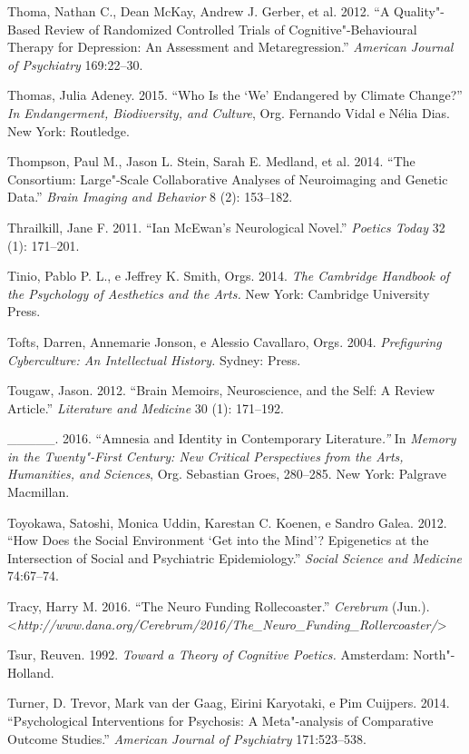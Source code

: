 {\begin{Parskip}
Thoma, Nathan C., Dean McKay, Andrew J. Gerber, et al. 2012. ``A
Quality"-Based Review of Randomized Controlled Trials of
Cognitive"-Behavioural Therapy for Depression: An Assessment and
Metaregression.'' \emph{American Journal of Psychiatry} 169:22--30.

Thomas, Julia Adeney. 2015. ``Who Is the `We' Endangered by Climate
Change?'' \emph{In Endangerment, Biodiversity, and Culture}, Org.
Fernando Vidal e Nélia Dias. New York: Routledge.

Thompson, Paul M., Jason L. Stein, Sarah E. Medland, et al. 2014. ``The
 Consortium: Large"-Scale Collaborative Analyses of Neuroimaging
and Genetic Data.'' \emph{Brain Imaging and Behavior} 8 (2): 153--182.

Thrailkill, Jane F. 2011. ``Ian McEwan's Neurological Novel.''
\emph{Poetics Today} 32 (1): 171--201.

Tinio, Pablo P. L., e Jeffrey K. Smith, Orgs. 2014. \emph{The Cambridge
Handbook of the Psychology of Aesthetics and the Arts.} New York:
Cambridge University Press.

Tofts, Darren, Annemarie Jonson, e Alessio Cavallaro, Orgs. 2004.
\emph{Prefiguring Cyberculture: An Intellectual History.} Sydney: 
Press.

Tougaw, Jason. 2012. ``Brain Memoirs, Neuroscience, and the Self: A
Review Article.'' \emph{Literature and Medicine} 30 (1): 171--192.

\_\_\_\_\_. 2016. ``Amnesia and Identity in Contemporary
Literature\emph{.''} In \emph{Memory in the Twenty"-First Century: New
Critical Perspectives from the Arts, Humanities, and Sciences}, Org.
Sebastian Groes, 280--285. New York: Palgrave Macmillan.

Toyokawa, Satoshi, Monica Uddin, Karestan C. Koenen, e Sandro Galea.
2012. ``How Does the Social Environment `Get into the Mind'? Epigenetics
at the Intersection of Social and Psychiatric Epidemiology.''
\emph{Social Science and Medicine} 74:67--74.

Tracy, Harry M. 2016. ``The Neuro Funding Rollecoaster.''
\emph{Cerebrum} (Jun.).
\textless{}\emph{http://www.dana.org/Cerebrum/2016/The\_Neuro\_Funding\_Rollercoaster/}\textgreater{}

Tsur, Reuven. 1992. \emph{Toward a Theory of Cognitive Poetics.}
Amsterdam: North"-Holland.

Turner, D. Trevor, Mark van der Gaag, Eirini Karyotaki, e Pim Cuijpers.
2014. ``Psychological Interventions for Psychosis: A Meta"-analysis of
Comparative Outcome Studies.'' \emph{American Journal of Psychiatry}
171:523--538.


\end{Parskip}}
